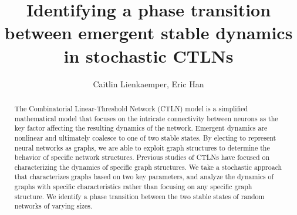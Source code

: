 \documentclass{article}
\title{Identifying a phase transition between emergent stable dynamics in stochastic CTLNs}
\author{Caitlin Lienkaemper, Eric Han}
\theoremstyle{definition}
\theoremstyle{remark}
\begin{document}
\begin{titlepage}
\thispagestyle{empty}
\maketitle

\begin{abstract}
The Combinatorial Linear-Threshold Network (CTLN) model is a simplified mathematical model that focuses on the intricate connectivity between neurons as the key factor affecting the resulting dynamics of the network. Emergent dynamics are nonlinear and ultimately coalesce to one of two stable states. By electing to represent neural networks as graphs, we are able to exploit graph structures to determine the behavior of specific network structures. Previous studies of CTLNs have focused on characterizing the dynamics of specific graph structures. We take a stochastic approach that characterizes graphs based on two key parameters, and analyze the dynamics of graphs with specific characteristics rather than focusing on any specific graph structure. We identify a phase transition between the two stable states of random networks of varying sizes.
\end{abstract}

\tableofcontents
\end{titlepage}





\end{document}

